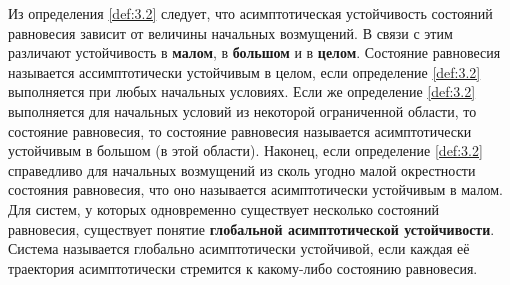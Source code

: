 Из определения \ref{def:3.2} следует, что асимптотическая устойчивость состояний равновесия зависит от величины начальных возмущений. В связи с этим различают устойчивость в \textbf{малом}, в \textbf{большом} и в \textbf{целом}. Состояние равновесия называется ассимптотически устойчивым в целом, если определение \ref{def:3.2} выполняется при любых начальных условиях. Если же определение \ref{def:3.2} выполняется для начальных условий из некоторой ограниченной области, то состояние равновесия, то состояние равновесия называется асимптотически устойчивым в большом (в этой области). Наконец, если определение \ref{def:3.2} справедливо для начальных  возмущений из сколь угодно малой окрестности состояния равновесия, что оно называется асимптотически устойчивым в малом.
Для систем, у которых одновременно существует несколько состояний равновесия, существует понятие \textbf{ глобальной асимптотической устойчивости}. Система называется глобально асимптотически устойчивой, если каждая её траектория асимптотически  стремится к какому-либо состоянию равновесия.

